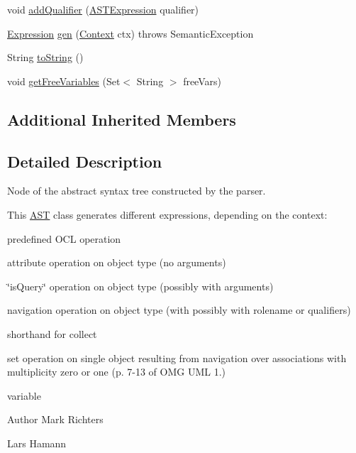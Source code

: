 \begin{DoxyCompactItemize}
\item 
void \hyperlink{classorg_1_1tzi_1_1use_1_1parser_1_1ocl_1_1_a_s_t_operation_expression_a3dd7d6112d148199629f2e5695186bf4}{add\-Qualifier} (\hyperlink{classorg_1_1tzi_1_1use_1_1parser_1_1ocl_1_1_a_s_t_expression}{A\-S\-T\-Expression} qualifier)
\item 
\hyperlink{classorg_1_1tzi_1_1use_1_1uml_1_1ocl_1_1expr_1_1_expression}{Expression} \hyperlink{classorg_1_1tzi_1_1use_1_1parser_1_1ocl_1_1_a_s_t_operation_expression_a240771728451385db5cfd8061100e470}{gen} (\hyperlink{classorg_1_1tzi_1_1use_1_1parser_1_1_context}{Context} ctx)  throws Semantic\-Exception 
\item 
String \hyperlink{classorg_1_1tzi_1_1use_1_1parser_1_1ocl_1_1_a_s_t_operation_expression_a9e13eaa4c0ac07033eff4b986a2cc445}{to\-String} ()
\item 
void \hyperlink{classorg_1_1tzi_1_1use_1_1parser_1_1ocl_1_1_a_s_t_operation_expression_a7a730cce29094577032e078cceb66bd8}{get\-Free\-Variables} (Set$<$ String $>$ free\-Vars)
\end{DoxyCompactItemize}
\subsection*{Additional Inherited Members}


\subsection{Detailed Description}
Node of the abstract syntax tree constructed by the parser.

This \hyperlink{classorg_1_1tzi_1_1use_1_1parser_1_1_a_s_t}{A\-S\-T} class generates different expressions, depending on the context\-:


\begin{DoxyEnumerate}
\item predefined O\-C\-L operation 
\item attribute operation on object type (no arguments) 
\item \char`\"{}is\-Query\char`\"{} operation on object type (possibly with arguments) 
\item navigation operation on object type (with possibly with rolename or qualifiers) 
\item shorthand for collect 
\item set operation on single object resulting from navigation over associations with multiplicity zero or one (p. 7-\/13 of O\-M\-G U\-M\-L 1.) 
\item variable 
\end{DoxyEnumerate}\begin{DoxyAuthor}{Author}
Mark Richters 

Lars Hamann 
\end{DoxyAuthor}


